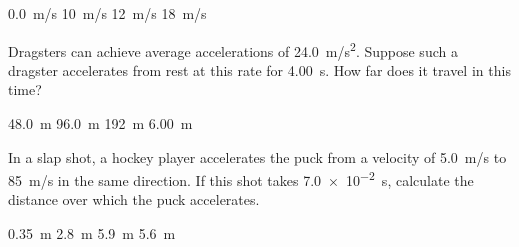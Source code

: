 \documentclass[addpoints]{exam}
\begin{document}
\begin{questions}
\begin{choices}
\choice \SI{0.0}{m/s}
\choice \SI{10}{m/s}
\choice \SI{12}{m/s}
\CorrectChoice \SI{18}{m/s}
\end{choices}

\question %
Dragsters can achieve average accelerations of \SI{24.0}{m/s^2}. Suppose such a dragster accelerates from rest at this rate for \SI{4.00}{s}. How far does it travel in this time?

\begin{choices}
\choice \SI{48.0}{m}
\choice \SI{96.0}{m}
\correctchoice \SI{192}{m}
\choice \SI{6.00}{m}
\end{choices}






\question %
In a slap shot, a hockey player accelerates the puck from a velocity of \SI{5.0}{m/s} to \SI{85}{m/s} in the same direction. If this shot takes \SI{7.0e-2}{s}, calculate the distance over which the puck accelerates.

\begin{choices}
\choice \SI{0.35}{m}
\correctchoice \SI{2.8}{m}
\choice \SI{5.9}{m}
\choice \SI{5.6}{m}
\end{choices}








\end{questions}
\end{document}
